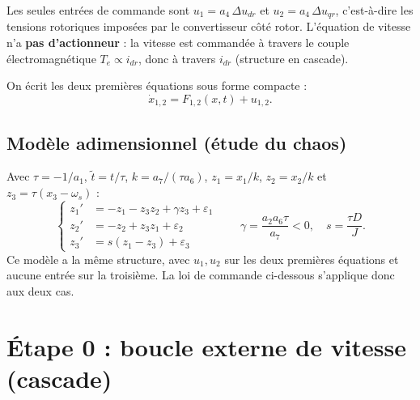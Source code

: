 \documentclass[11pt,a4paper]{article}
\begin{document}
Les seules entrées de commande sont $u_1=a_4\,\Delta u_{dr}$ et $u_2=a_4\,\Delta u_{qr}$, c'est-à-dire les tensions rotoriques imposées par le convertisseur côté rotor. L'équation de vitesse n'a \textbf{pas d'actionneur} : la vitesse est commandée à travers le couple électromagnétique $T_e\propto i_{dr}$, donc à travers $i_{dr}$ (structure en cascade).

On écrit les deux premières équations sous forme compacte :
\begin{equation}
\dot x_{1,2} = F_{1,2}(x,t)+u_{1,2} .
\label{eq:compact}
\end{equation}

\subsection{Modèle adimensionnel (étude du chaos)}
Avec $\tau=-1/a_1$, $\tilde t=t/\tau$, $k=a_7/(\tau a_6)$, $z_1=x_1/k$, $z_2=x_2/k$ et $z_3=\tau(x_3-\omega_s)$ :
\begin{equation}
\left\{\begin{aligned}
z_1'&=-z_1-z_3z_2+\gamma z_3+\varepsilon_1\\
z_2'&=-z_2+z_3z_1+\varepsilon_2\\
z_3'&=s(z_1-z_3)+\varepsilon_3
\end{aligned}\right.
\qquad
\gamma=\frac{a_2a_6\tau}{a_7}<0,\quad s=\frac{\tau D}{J}.
\label{eq:adim}
\end{equation}
Ce modèle a la même structure, avec $u_1,u_2$ sur les deux premières équations et aucune entrée sur la troisième. La loi de commande ci-dessous s'applique donc aux deux cas.

\section{Étape 0 : boucle externe de vitesse (cascade)}
\end{document}
